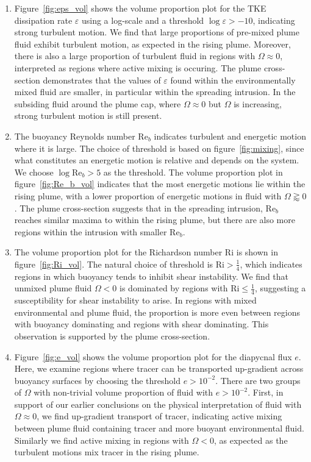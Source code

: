 \documentclass[a4paper]{article}
\begin{document}
\begin{enumerate}[label=(\alph*)]
	\item Figure~\ref{fig:eps_vol} shows the volume proportion plot for the TKE dissipation rate $\varepsilon$
		using a log-scale and a threshold $\log \varepsilon > -10$, indicating strong turbulent motion. We
		find that large proportions of pre-mixed plume fluid exhibit turbulent motion, as expected in the rising
		plume. Moreover, there is also a large proportion of turbulent fluid in regions with $\Omega \approx
		0$, interpreted as regions where active mixing is occuring. The plume cross-section demonstrates that
		the values of $\varepsilon$ found within the environmentally mixed fluid are smaller, in particular
		within the spreading intrusion. In the subsiding fluid around the plume cap, where $\Omega \approx 0$
		but $\Omega$ is increasing, strong turbulent motion is still present.

	\item The buoyancy Reynolds number $\mathrm{Re}_b$ indicates turbulent and energetic motion where it is
		large. The choice of threshold is based on figure~\ref{fig:mixing}, since what constitutes an
		energetic motion is relative and depends on the system. We choose $\log \mathrm{Re}_b > 5$ as the
		threshold. The volume proportion plot in figure~\ref{fig:Re_b_vol} indicates that the most energetic
		motions lie within the rising plume, with a lower proportion of energetic motions in fluid with
		$\Omega \gtrapprox 0$. The plume cross-section suggests that in the spreading intrusion,
		$\mathrm{Re}_b$ reaches similar maxima to within the rising plume, but there are also more regions
		within the intrusion with smaller $\mathrm{Re}_b$.

	\item The volume proportion plot for the Richardson number $\mathrm{Ri}$ is shown in
		figure~\ref{fig:Ri_vol}. The natural choice of threshold is $\mathrm{Ri} > \frac{1}{4}$, which
		indicates regions in which buoyancy tends to inhibit shear instability. We find that unmixed plume
		fluid $\Omega < 0$ is dominated by regions with $\mathrm{Ri} \le \frac{1}{4}$, suggesting
		a susceptibility for shear instability to arise. In regions with mixed environmental and plume fluid,
		the proportion is more even between regions with buoyancy dominating and regions with shear
		dominating. This observation is supported by the plume cross-section.

	\item Figure~\ref{fig:e_vol} shows the volume proportion plot for the diapycnal flux $e$. Here, we examine
		regions where tracer can be transported up-gradient across buoyancy surfaces by choosing the threshold
		$e > 10^{-2}$. There are two groups of $\Omega$ with non-trivial volume proportion of fluid with $e >
		10^{-2}$. First, in support of our earlier conclusions on the physical interpretation of fluid with
		$\Omega \approx 0$, we find up-gradient transport of tracer, indicating active mixing between plume
		fluid containing tracer and more buoyant environmental fluid. Similarly we find active mixing in
		regions with $\Omega < 0$, as expected as the turbulent motions mix tracer in the rising plume.
\end{enumerate}
\end{document}
